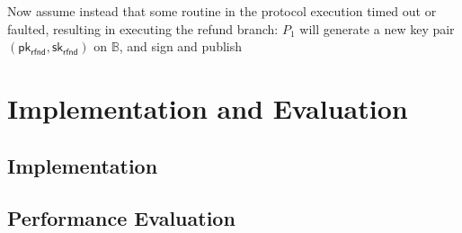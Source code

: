 \documentclass{article}      	%
\begin{document}
Now assume instead that some routine in the protocol execution timed out or faulted, resulting in executing the refund branch: $P_1$ will generate a new key pair $(\mathsf{pk_{rfnd}}, \mathsf{sk_{rfnd}})$ on $\mathbb{B}$, and sign and publish


\section{Implementation and Evaluation}

\subsection{Implementation}


\subsection{Performance Evaluation}


\printbibliography
\end{document}
